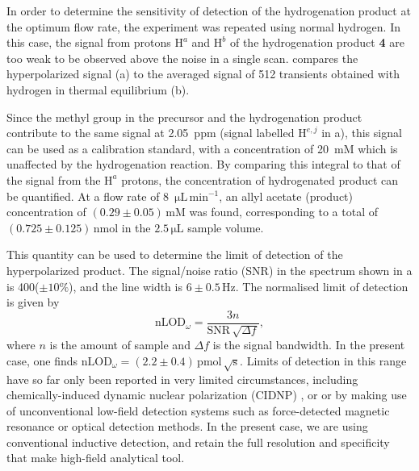 In order to determine the sensitivity of detection of the hydrogenation product
at the optimum flow rate, the experiment was repeated using normal hydrogen.
In this case, the signal from  protons $\mathrm{H}^a$ and $\mathrm{H}^b$
of the hydrogenation product \textbf{4}
are too weak to be observed above the noise in a single scan.
compares the hyperpolarized signal (a) to the averaged signal of 512 transients
obtained with hydrogen in thermal equilibrium (b).

Since the methyl group in the
precursor and the hydrogenation product contribute to the same signal at 2.05~ppm
(signal labelled $\mathrm{H}^{e,j}$ in a),
this signal can be used as a calibration standard, with a concentration of 20~mM
which is unaffected by the hydrogenation reaction. By comparing this integral to that
of the signal from the $\mathrm{H}^a$ protons, the concentration
of hydrogenated product can be
quantified. At a flow rate of 8~$\mathrm{\mu L\,\text{min}^{-1}}$, an allyl acetate
(product) concentration of $(0.29\pm 0.05)\,\mathrm{mM}$ was found, corresponding to a total
of $(0.725\pm0.125)\,\text{nmol}$ in the $2.5\,\mathrm{\mu L}$ sample volume.


This quantity can be used to determine the limit of detection of the
hyperpolarized product. The signal/noise ratio (SNR) in the spectrum shown in
a is 400($\pm 10\%$), and the line width is $6\pm
0.5\,\text{Hz}$. The normalised limit of detection is given by \[
\text{nLOD}_\omega = \frac{3 n}{\text{SNR}\,\sqrt{\Delta f}}, \] where $n$ is
the amount of sample and $\Delta f$ is the signal bandwidth. In the present
case, one finds $\text{nLOD}_\omega = (2.2\pm
0.4)\,\text{pmol}\,\sqrt{\text{s}}$. Limits of detection in this range have so
far only been reported in very limited circumstances, including
chemically-induced dynamic nuclear polarization (CIDNP)
\cite{mompean2018pushing}, or or by making use of unconventional low-field
detection systems
such as force-detected magnetic resonance or optical detection methods\cite{Rugar:1992dm,Rugar:2004bc,Mamin:2007ff,Poggio:2010jf,
Maze:2008cs,Staudacher:2013kn,Rugar:2015by,McDermott:2002hp,
Budker:2007hz,Xu:2006kg,Blanchard:2013gs}. In the
present case, we are using conventional inductive detection, and retain the full
resolution and specificity that make high-field
analytical tool.

